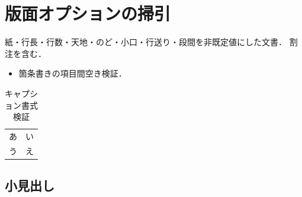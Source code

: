 \documentclass[pdflatex,paper=b5,fontsize=12pt,line_length=40zw,number_of_lines=10,head_space=15mm,foot_space=20mm,gutter=15mm,fore_edge=20mm,baselineskip=20pt,column_gap=2zw,twoside]{jlreq}
\begin{document}
\section{版面オプションの掃引}
紙・行長・行数・天地・のど・小口・行送り・段間を非既定値にした文書．
割注を含む．
\begin{itemize}\item 箇条書きの項目間空き検証．\end{itemize}
\begin{table}[htbp]\centering\caption{キャプション書式検証}
\begin{tabular}{cc} あ & い \\ う & え \\\end{tabular}\end{table}
\subsection{小見出し}
\makeatletter
{}%
\makeatother
\end{document}
